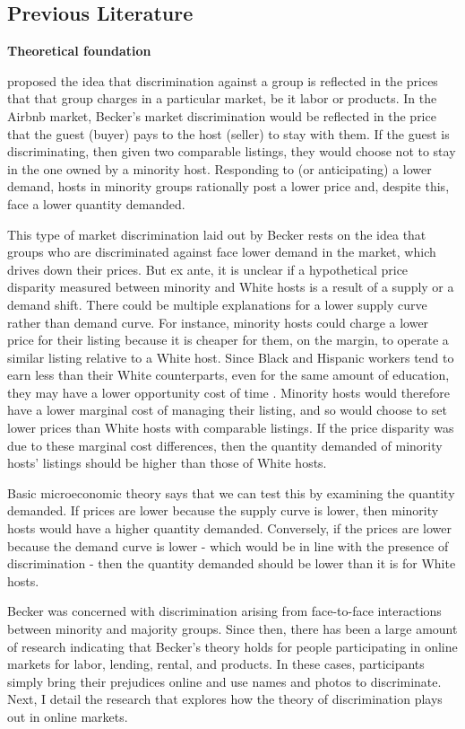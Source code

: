 \subsection{Previous Literature} 
\label{previous}

\textbf{Theoretical foundation}

\cite{becker} proposed the idea that discrimination against a group is reflected in the prices that that group charges in a particular market, be it labor or products. In the Airbnb market, Becker's market discrimination would be reflected in the price that the guest (buyer) pays to the host (seller) to stay with them. If the guest is discriminating, then given two comparable listings, they would choose not to stay in the one owned by a minority host. Responding to (or anticipating) a lower demand, hosts in minority groups rationally post a lower price and, despite this, face a lower quantity demanded. 

This type of market discrimination laid out by Becker rests on the idea that groups who are discriminated against face lower demand in the market, which drives down their prices. But ex ante, it is unclear if a hypothetical price disparity measured between minority and White hosts is a result of a supply or a demand shift. There could be multiple explanations for a lower supply curve rather than demand curve. For instance, minority hosts could charge a lower price for their listing because it is cheaper for them, on the margin, to operate a similar listing relative to a White host. Since Black and Hispanic workers tend to earn less than their White counterparts, even for the same amount of education, they may have a lower opportunity cost of time \citep{wages}. Minority hosts would therefore have a lower marginal cost of managing their listing, and so would choose to set lower prices than White hosts with comparable listings. If the price disparity was due to these marginal cost differences, then the quantity demanded of minority hosts' listings should be higher than those of White hosts. 

Basic microeconomic theory says that we can test this by examining the quantity demanded. If prices are lower because the supply curve is lower, then minority hosts would have a higher quantity demanded. Conversely, if the prices are lower because the demand curve is lower - which would be in line with the presence of discrimination - then the quantity demanded should be lower than it is for White hosts. 

Becker was concerned with discrimination arising from face-to-face interactions between minority and majority groups. Since then, there has been a large amount of research indicating that Becker's theory holds for people participating in online markets for labor, lending, rental, and products. In these cases, participants simply bring their prejudices online and use names and photos to discriminate. Next, I detail the research that explores how the theory of discrimination plays out in online markets. 




